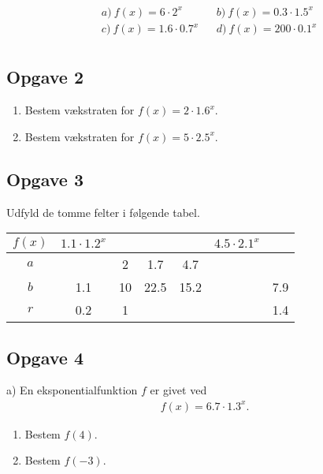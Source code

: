 \begin{align*}
	&a) \ f(x) = 6 \cdot 2^x    &&b) \  f(x) = 0.3 \cdot 1.5^x   \\
	&c) \ f(x) = 1.6 \cdot 0.7^x   &&d) \ f(x) = 200\cdot 0.1^x    \\  
\end{align*}

\subsection*{Opgave 2}

\begin{enumerate}[label = \roman*)]
	\item Bestem vækstraten for $f(x) = 2\cdot 1.6^x$.
	\item Bestem vækstraten for $f(x) = 5 \cdot 2.5^x$.
\end{enumerate}

\subsection*{Opgave 3}

Udfyld de tomme felter i følgende tabel. 

\begin{center}
	\begin{tabular}{c|c|c|c|c|c|c|}
		$f(x)$ & $1.1\cdot 1.2^x$ & \phantom{$1.1\cdot 1.2^x$} & \phantom{$1.1\cdot 1.2^x$} & \phantom{$1.1\cdot 1.2^x$}& $4.5 \cdot 2.1^x$ &\phantom{$1.1\cdot 1.2^x$}  \\
		\hline
		$a$ & & 2 & 1.7 & 4.7 & &  \\
		\hline
		$b$ & 1.1 & 10 & 22.5 & 15.2 & & 7.9 \\
		\hline
		$r$ & 0.2 & 1 & & & & 1.4 \\
	\end{tabular}
\end{center}

\subsection*{Opgave 4}
a) En eksponentialfunktion $f$ er givet ved
\begin{align*}
	f(x) = 6.7\cdot 1.3^x.
\end{align*}
\begin{enumerate}[label=\roman*)]
	\item Bestem $f(4)$.
	\item Bestem $f(-3)$.
\end{enumerate}

